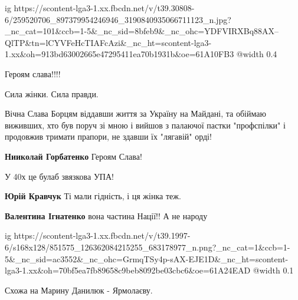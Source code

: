  
 
 
 
 

\ifcmt
  ig https://scontent-lga3-1.xx.fbcdn.net/v/t39.30808-6/259520706_897379954246946_3190840935066711123_n.jpg?_nc_cat=101&ccb=1-5&_nc_sid=8bfeb9&_nc_ohc=YDFVIRXBq88AX--QlTP&tn=lCYVFeHcTIAFcAzi&_nc_ht=scontent-lga3-1.xx&oh=913bd63002665e47295411ea70b1931b&oe=61A10FB3
  @width 0.4
\fi

Героям слава!!!!

Сила жінки. Сила правди.


Вічна Слава Борцям віддавши життя за Україну на Майдані, та обіймаю виживших,
хто був поруч зі мною і вийшов з палаючої пастки "профспілки" і продовжив
тримати прапори, не здавши їх "лягавій" орді!

\textbf{Нииколай Горбатенко} Героям Слава!

У 40х це булаб звязкова УПА!

\textbf{Юрій Кравчук} Ті мали гідність, і ця жінка теж.

\textbf{Валентина Ігнатенко} вона частина Нації!! А не народу


\ifcmt
  ig https://scontent-lga3-1.xx.fbcdn.net/v/t39.1997-6/s168x128/851575_126362084215255_683178977_n.png?_nc_cat=1&ccb=1-5&_nc_sid=ac3552&_nc_ohc=GrmqTSy4p-sAX-EJE1D&_nc_ht=scontent-lga3-1.xx&oh=70bf5ea7fb89658c9beb8092be03cbc6&oe=61A24EAD
  @width 0.1
\fi

Схожа на Марину Данилюк - Ярмолаєву.
